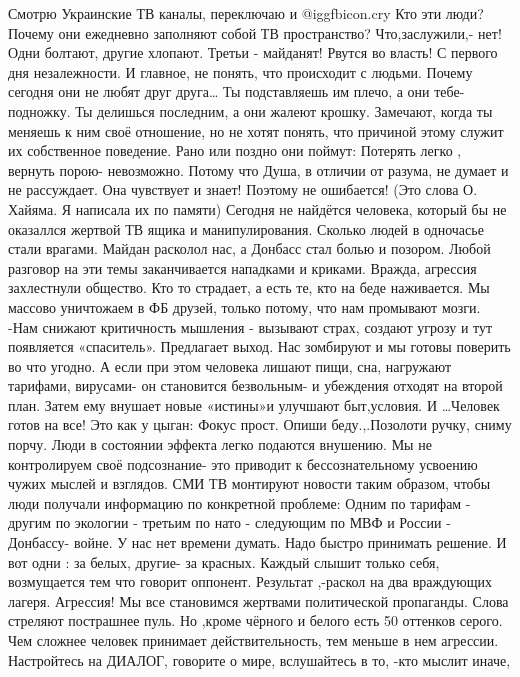 \begin{multicols}{2}
\obeycr
Смотрю Украинские ТВ
каналы, переключаю и  @igg{fbicon.cry} 
Кто эти люди? Почему они ежедневно заполняют собой ТВ пространство? 
Что,заслужили,- нет! 
Одни болтают, другие хлопают.   Третьи - майданят!
 Рвутся во власть!
С первого дня незалежности. 
И главное, не понять, что происходит с людьми. 
Почему сегодня они не любят друг друга…
Ты подставляешь им плечо, а они тебе- подножку.
Ты делишься последним, а они жалеют крошку.
Замечают, когда ты меняешь к ним своё отношение, но не хотят понять, что причиной этому служит их собственное поведение.
Рано или поздно они поймут:
Потерять легко , вернуть  порою- невозможно. 
Потому что Душа, в отличии от разума, не думает и не рассуждает. 
Она чувствует и знает!
 Поэтому не ошибается! 
(Это слова О. Хайяма. 
Я написала  их по памяти)
 Сегодня не найдётся человека, который бы не оказаллся жертвой   ТВ ящика  и манипулирования. 
Сколько людей в одночасье стали врагами.  
Майдан расколол нас,  а Донбасс стал болью и позором.
Любой разговор  на эти темы заканчивается нападками и  криками.   
Вражда, агрессия захлестнули общество.  
Кто то страдает, а есть те, кто на беде наживается.
Мы массово уничтожаем в ФБ друзей, только потому, что нам промывают мозги.
-Нам снижают критичность мышления
- вызывают страх, создают  угрозу и тут 
появляется «спаситель». Предлагает выход.
Нас зомбируют и мы готовы поверить во что угодно.
А если при этом человека лишают пищи, сна, нагружают тарифами, вирусами- он становится безвольным- и убеждения отходят на второй план. 
Затем  ему внушает новые «истины»и  улучшают быт,условия. 
 И …Человек готов на все! 
Это как у цыган: 
Фокус прост.  Опиши беду.,.Позолоти ручку, 
сниму порчу. 
Люди в состоянии эффекта легко подаются внушению.
Мы не контролируем своё подсознание- это приводит к бессознательному усвоению чужих мыслей и взглядов.
СМИ ТВ монтируют новости таким образом, чтобы люди получали информацию по конкретной проблеме:
Одним по тарифам
- другим по экологии
- третьим по нато
- следующим по МВФ и России
- Донбассу- войне.
У нас нет времени думать. Надо быстро принимать решение. 
И вот одни : за белых, другие- за красных. Каждый слышит только себя, возмущается тем что говорит оппонент.
Результат ,-раскол на два враждующих лагеря.
Агрессия!
Мы все становимся жертвами политической пропаганды.
Слова стреляют пострашнее пуль. Но ,кроме чёрного и белого есть 50 оттенков серого. 
Чем сложнее человек принимает действительность, тем меньше в нем агрессии.
Настройтесь на ДИАЛОГ, говорите о мире, вслушайтесь в то,  -кто мыслит иначе, 

\end{multicols}
